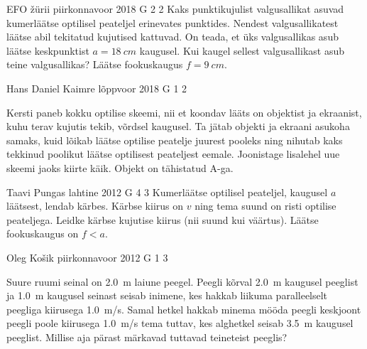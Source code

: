 \documentclass[11pt]{article}
\begin{document}
{%
{EFO žürii} %
{piirkonnavoor} %
{2018} %
{G 2} %
{2} %
{
\ifStatement
Kaks punktikujulist valgusallikat asuvad kumerläätse optilisel peateljel erinevates punktides. Nendest valgusallikatest läätse abil tekitatud kujutised kattuvad. On teada, et üks valgusallikas asub läätse keskpunktist $a=\SI{18}{cm}$ kaugusel. Kui kaugel sellest valgusallikast asub teine valgusallikas? Läätse fookuskaugus $f=\SI{9}{cm}$. 
\fi
}

{Hans Daniel Kaimre} %
{lõppvoor} %
{2018} %
{G 1} %
{2} %
{
\ifStatement
Kersti paneb kokku optilise skeemi, nii et koondav lääts on objektist ja ekraanist, kuhu terav kujutis tekib, võrdsel kaugusel. Ta jätab objekti ja ekraani asukoha samaks, kuid lõikab läätse optilise peatelje juurest pooleks ning nihutab kaks tekkinud poolikut läätse optilisest peateljest eemale. Joonistage lisalehel uue skeemi jaoks kiirte käik. Objekt on tähistatud A-ga.
\begin{center}
\end{center}
\fi
}

{Taavi Pungas} %
{lahtine} %
{2012} %
{G 4} %
{3} %
{
\ifStatement
Kumerläätse optilisel peateljel, kaugusel $a$ läätsest, lendab kärbes.
Kärbse kiirus on $v$ ning tema suund on risti optilise peateljega.
Leidke kärbse kujutise kiirus (nii suund kui väärtus). Läätse
fookuskaugus on $f < a$.
\fi
}
\newpage


{Oleg Košik} %
{piirkonnavoor} %
{2012} %
{G 1} %
{3} %
{
\ifStatement
Suure ruumi seinal on \SI{2,0}{m} laiune peegel. Peegli kõrval \SI{2,0}{m}
kaugusel peeglist ja \SI{1,0}{m} kaugusel seinast seisab inimene, kes hakkab
liikuma paralleelselt peegliga kiirusega \SI{1,0}{m/s}. Samal hetkel hakkab
minema mööda peegli keskjoont peegli poole kiirusega \SI{1,0}{m/s} tema tuttav,
kes alghetkel seisab \SI{3,5}{m} kaugusel peeglist. Millise aja pärast
märkavad tuttavad teineteist peeglis?

}}
\end{document}
